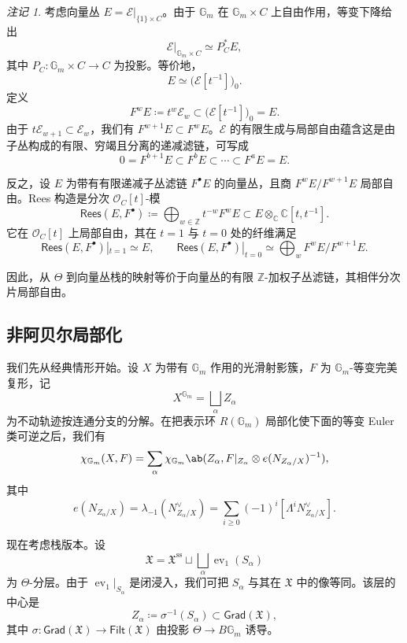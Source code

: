 \documentclass{amsart}
\theoremstyle{definition}
\theoremstyle{remark}
\newtheorem{rmk}[thm]{注记}
\theoremstyle{plain}
\theoremstyle{definition}
\theoremstyle{remark}
\newcommand{\G}{\mathbb{G}}
\newcommand{\C}{\mathbb{C}}
\newcommand{\Z}{\mathbb{Z}}
\newcommand{\mc}[1]{\mathcal{#1}}
\newcommand{\mf}[1]{\mathfrak{#1}}
\newcommand{\mr}[1]{\mathrm{#1}}
\newcommand{\ms}[1]{\mathsf{#1}}
\newcommand{\1}{\mathbf{1}}
\newcommand{\2}{\mathbf{2}}
\newcommand{\3}{\mathbf{3}}
\DeclareMathOperator{\ev}{ev}
\begin{document}
\begin{rmk}
    考虑向量丛 \(E=\mc{E}|_{\{1\}\times C}\)。由于 \(\G_m\) 在 \(\G_m\times C\) 上自由作用，等变下降给出
    \[
        \mc{E}|_{\G_m\times C}\simeq P_C^*E,
    \]
    其中 \(P_C\colon\G_m\times C\to C\) 为投影。等价地，
    \[
        E\simeq\big(\mc{E}[t^{-1}]\big)_0.
    \]
    定义
    \[
        F^wE\coloneqq t^w\mc{E}_w\subset\big(\mc{E}[t^{-1}]\big)_0=E.
    \]
    由于 \(t\mc{E}_{w+1}\subset\mc{E}_w\)，我们有 \(F^{w+1}E\subset F^wE\)。\(\mc{E}\) 的有限生成与局部自由蕴含这是由子丛构成的有限、穷竭且分离的递减滤链，可写成
    \[
        0=F^{b+1}E\subset F^bE\subset\cdots\subset F^aE=E.
    \]

    反之，设 \(E\) 为带有有限递减子丛滤链 \(F^\bullet E\) 的向量丛，且商 \(F^wE/F^{w+1}E\) 局部自由。Rees 构造是分次 \(\mc{O}_C[t]\)-模
    \[
        \ms{Rees}(E,F^\bullet)
        \coloneqq
        \bigoplus_{w\in\Z}t^{-w}F^wE
        \subset
        E\otimes_{\C}\C[t,t^{-1}].
    \]
    它在 \(\mc{O}_C[t]\) 上局部自由，其在 \(t=1\) 与 \(t=0\) 处的纤维满足
    \[
        \ms{Rees}(E,F^\bullet)|_{t=1}\simeq E,
        \qquad
        \ms{Rees}(E,F^\bullet)|_{t=0}
        \simeq
        \bigoplus_w F^wE/F^{w+1}E.
    \]
\end{rmk}

因此，从 \(\Theta\) 到向量丛栈的映射等价于向量丛的有限 \(\Z\)-加权子丛滤链，其相伴分次片局部自由。


\subsection{非阿贝尔局部化}%
\label{sub:Non-abelian localization}

我们先从经典情形开始。设 \(X\) 为带有 \(\G_m\) 作用的光滑射影簇，\(F\) 为 \(\G_m\)-等变完美复形，记
\[
    X^{\G_m}=\bigsqcup_\alpha Z_\alpha
\]
为不动轨迹按连通分支的分解。在把表示环 \(R(\G_m)\) 局部化使下面的等变 Euler 类可逆之后，我们有
\[
    \chi_{\G_m}(X,F)
    =
    \sum_\alpha
    \chi_{\G_m}\ab(
        Z_\alpha,
        F|_{Z_\alpha}\otimes e(N_{Z_\alpha/X})^{-1}
    ),
\]
其中
\[
    e(N_{Z_\alpha/X})
    =
    \lambda_{-1}(N_{Z_\alpha/X}^\vee)
    =
    \sum_{i\geq0}(-1)^i[\Lambda^iN_{Z_\alpha/X}^\vee].
\]

现在考虑栈版本。设
\[
    \mf{X}
    =
    \mf{X}^{\mr{ss}}
    \sqcup
    \bigsqcup_\alpha\ev_1(S_\alpha)
\]
为 \(\Theta\)-分层。由于 \(\ev_1|_{S_\alpha}\) 是闭浸入，我们可把 \(S_\alpha\) 与其在 \(\mf{X}\) 中的像等同。该层的中心是
\[
    Z_\alpha\coloneqq\sigma^{-1}(S_\alpha)\subset\ms{Grad}(\mf{X}),
\]
其中 \(\sigma\colon\ms{Grad}(\mf{X})\to\ms{Filt}(\mf{X})\) 由投影 \(\Theta\to B\G_m\) 诱导。
\end{document}

